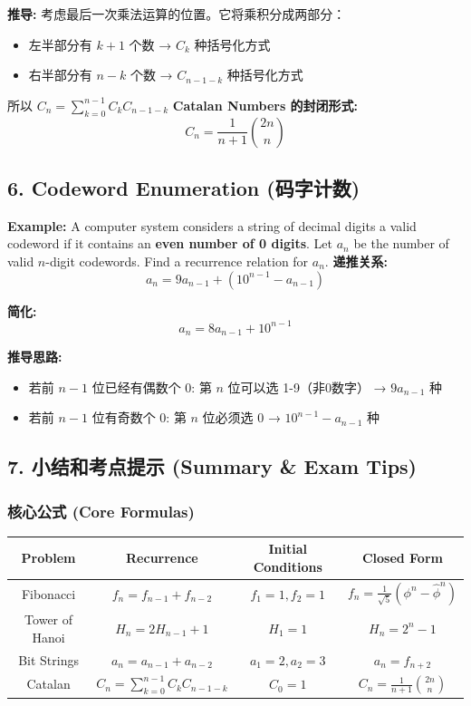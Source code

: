 \documentclass[10pt,a4paper,openany]{ctexbook}
\theoremstyle{definition}
\theoremstyle{remark}
\begin{document}
\textbf{推导:} 考虑最后一次乘法运算的位置。它将乘积分成两部分：
\begin{itemize}
\item 左半部分有 $k+1$ 个数 → $C_k$ 种括号化方式
\item 右半部分有 $n-k$ 个数 → $C_{n-1-k}$ 种括号化方式

\end{itemize}

所以 $C_n = \sum_{k=0}^{n-1} C_k C_{n-1-k}$
\textbf{Catalan Numbers 的封闭形式:}
\[
C_n = \frac{1}{n+1} \binom{2n}{n}
\]

\vspace{-2pt}

\subsection{6. Codeword Enumeration (码字计数)}

\textbf{Example:} A computer system considers a string of decimal digits a valid codeword if it contains an \textbf{even number of 0 digits}. Let $a_n$ be the number of valid $n$-digit codewords. Find a recurrence relation for $a_n$.
\textbf{递推关系:}
\[
a_n = 9a_{n-1} + (10^{n-1} - a_{n-1})
\]

\textbf{简化:}
\[
a_n = 8a_{n-1} + 10^{n-1}
\]

\textbf{推导思路:}
\begin{itemize}
\item 若前 $n-1$ 位已经有偶数个 0: 第 $n$ 位可以选 1-9（非0数字） → $9a_{n-1}$ 种
\item 若前 $n-1$ 位有奇数个 0: 第 $n$ 位必须选 0 → $10^{n-1} - a_{n-1}$ 种

\end{itemize}

\vspace{-2pt}

\subsection{7. 小结和考点提示 (Summary \& Exam Tips)}

\subsubsection{核心公式 (Core Formulas)}

\begin{center}
\begin{tabular}{cccc}
\hline
Problem & Recurrence & Initial Conditions & Closed Form \\ \hline
Fibonacci & $f_n = f_{n-1} + f_{n-2}$ & $f_1 = 1, f_2 = 1$ & $f_n = \frac{1}{\sqrt{5}}(\phi^n - \hat{\phi}^n)$ \\
Tower of Hanoi & $H_n = 2H_{n-1} + 1$ & $H_1 = 1$ & $H_n = 2^n - 1$ \\
Bit Strings & $a_n = a_{n-1} + a_{n-2}$ & $a_1 = 2, a_2 = 3$ & $a_n = f_{n+2}$ \\
Catalan & $C_n = \sum_{k=0}^{n-1} C_k C_{n-1-k}$ & $C_0 = 1$ & $C_n = \frac{1}{n+1}\binom{2n}{n}$ \\
\hline
\end{tabular}

\end{center}
\end{document}
